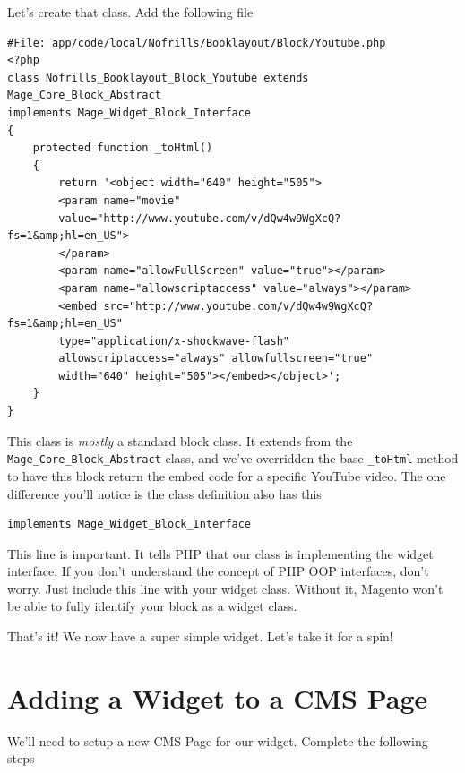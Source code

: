 \documentclass[oneside]{book}
\begin{document}
Let's create that class.  Add the following file

\begin{lstlisting}
#File: app/code/local/Nofrills/Booklayout/Block/Youtube.php
<?php
class Nofrills_Booklayout_Block_Youtube extends Mage_Core_Block_Abstract
implements Mage_Widget_Block_Interface
{
    protected function _toHtml()
    {
        return '<object width="640" height="505">
        <param name="movie"
        value="http://www.youtube.com/v/dQw4w9WgXcQ?fs=1&amp;hl=en_US">
        </param>
        <param name="allowFullScreen" value="true"></param>
        <param name="allowscriptaccess" value="always"></param>
        <embed src="http://www.youtube.com/v/dQw4w9WgXcQ?fs=1&amp;hl=en_US"
        type="application/x-shockwave-flash"
        allowscriptaccess="always" allowfullscreen="true"
        width="640" height="505"></embed></object>';
    }
}

\end{lstlisting}


This class is \emph{mostly} a standard block class.  It extends from the \footnotesize\texttt{Mage\_Core\_Block\_Abstract} \normalsize  class, and we've overridden the base \footnotesize\texttt{\_toHtml} \normalsize  method to have this block return the embed code for a specific YouTube video.  The one difference you'll notice is the class definition also has this

\begin{lstlisting}
implements Mage_Widget_Block_Interface

\end{lstlisting}


This line is important.  It tells PHP that our class is implementing the widget interface.  If you don't understand the concept of PHP OOP interfaces, don't worry.  Just include this line with your widget class.  Without it, Magento won't be able to fully identify your block as a widget class.

That's it!  We now have a super simple widget.  Let's take it for a spin!

\section{Adding a Widget to a CMS Page}

We'll need to setup a new CMS Page for our widget.  Complete the following steps
\end{document}
